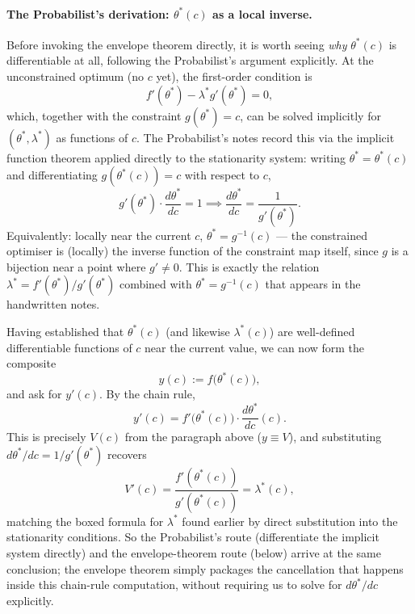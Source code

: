 \documentclass[a4paper,oneside,12pt]{extarticle}
\theoremstyle{plain}
\theoremstyle{definition}
\theoremstyle{remark}
\begin{document}
\paragraph{The Probabilist's derivation: $\theta^*(c)$ as a local inverse.}
Before invoking the envelope theorem directly, it is worth seeing
\emph{why} $\theta^*(c)$ is differentiable at all, following the Probabilist's
argument explicitly.  At the unconstrained optimum (no $c$ yet),
the first-order condition is
\[
  f'(\theta^*) - \lambda^* g'(\theta^*) = 0,
\]
which, together with the constraint $g(\theta^*)=c$, can be solved
implicitly for $(\theta^*,\lambda^*)$ as functions of $c$.  The Probabilist's
notes record this via the implicit function theorem applied
directly to the stationarity system: writing $\theta^*=\theta^*(c)$
and differentiating $g(\theta^*(c)) = c$ with respect to $c$,
\[
  g'(\theta^*)\cdot\frac{d\theta^*}{dc} = 1
  \implies
  \frac{d\theta^*}{dc} = \frac{1}{g'(\theta^*)}.
\]
Equivalently: locally near the current $c$, $\theta^* = g^{-1}(c)$
--- the constrained optimiser is (locally) the inverse function of
the constraint map itself, since $g$ is a bijection near a point
where $g'\ne 0$.  This is exactly the relation
$\lambda^* = f'(\theta^*)/g'(\theta^*)$ combined with
$\theta^*=g^{-1}(c)$ that appears in the handwritten notes.

Having established that $\theta^*(c)$ (and likewise $\lambda^*(c)$)
are well-defined differentiable functions of $c$ near the current
value, we can now form the composite
\[
  y(c) := f\big(\theta^*(c)\big),
\]
and ask for $y'(c)$.  By the chain rule,
\[
  y'(c) = f'\big(\theta^*(c)\big)\cdot \frac{d\theta^*}{dc}(c).
\]
This is precisely $V(c)$ from the paragraph above ($y\equiv V$),
and substituting $d\theta^*/dc = 1/g'(\theta^*)$ recovers
\[
  V'(c) = \frac{f'(\theta^*(c))}{g'(\theta^*(c))} = \lambda^*(c),
\]
matching the boxed formula for $\lambda^*$ found earlier by direct
substitution into the stationarity conditions.  So the Probabilist's route
(differentiate the implicit system directly) and the envelope-theorem
route (below) arrive at the same conclusion; the envelope theorem
simply packages the cancellation that happens inside this
chain-rule computation, without requiring us to solve for
$d\theta^*/dc$ explicitly.
\end{document}

